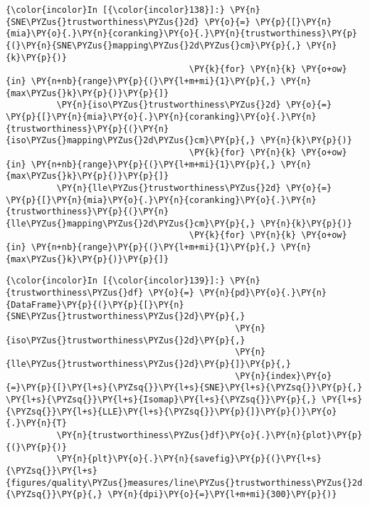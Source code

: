     \begin{Verbatim}[commandchars=\\\{\}]
{\color{incolor}In [{\color{incolor}138}]:} \PY{n}{SNE\PYZus{}trustworthiness\PYZus{}2d} \PY{o}{=} \PY{p}{[}\PY{n}{mia}\PY{o}{.}\PY{n}{coranking}\PY{o}{.}\PY{n}{trustworthiness}\PY{p}{(}\PY{n}{SNE\PYZus{}mapping\PYZus{}2d\PYZus{}cm}\PY{p}{,} \PY{n}{k}\PY{p}{)}
                                    \PY{k}{for} \PY{n}{k} \PY{o+ow}{in} \PY{n+nb}{range}\PY{p}{(}\PY{l+m+mi}{1}\PY{p}{,} \PY{n}{max\PYZus{}k}\PY{p}{)}\PY{p}{]}
          \PY{n}{iso\PYZus{}trustworthiness\PYZus{}2d} \PY{o}{=} \PY{p}{[}\PY{n}{mia}\PY{o}{.}\PY{n}{coranking}\PY{o}{.}\PY{n}{trustworthiness}\PY{p}{(}\PY{n}{iso\PYZus{}mapping\PYZus{}2d\PYZus{}cm}\PY{p}{,} \PY{n}{k}\PY{p}{)}
                                    \PY{k}{for} \PY{n}{k} \PY{o+ow}{in} \PY{n+nb}{range}\PY{p}{(}\PY{l+m+mi}{1}\PY{p}{,} \PY{n}{max\PYZus{}k}\PY{p}{)}\PY{p}{]}
          \PY{n}{lle\PYZus{}trustworthiness\PYZus{}2d} \PY{o}{=} \PY{p}{[}\PY{n}{mia}\PY{o}{.}\PY{n}{coranking}\PY{o}{.}\PY{n}{trustworthiness}\PY{p}{(}\PY{n}{lle\PYZus{}mapping\PYZus{}2d\PYZus{}cm}\PY{p}{,} \PY{n}{k}\PY{p}{)}
                                    \PY{k}{for} \PY{n}{k} \PY{o+ow}{in} \PY{n+nb}{range}\PY{p}{(}\PY{l+m+mi}{1}\PY{p}{,} \PY{n}{max\PYZus{}k}\PY{p}{)}\PY{p}{]}
\end{Verbatim}

    \begin{Verbatim}[commandchars=\\\{\}]
{\color{incolor}In [{\color{incolor}139}]:} \PY{n}{trustworthiness\PYZus{}df} \PY{o}{=} \PY{n}{pd}\PY{o}{.}\PY{n}{DataFrame}\PY{p}{(}\PY{p}{[}\PY{n}{SNE\PYZus{}trustworthiness\PYZus{}2d}\PY{p}{,}
                                             \PY{n}{iso\PYZus{}trustworthiness\PYZus{}2d}\PY{p}{,}
                                             \PY{n}{lle\PYZus{}trustworthiness\PYZus{}2d}\PY{p}{]}\PY{p}{,}
                                             \PY{n}{index}\PY{o}{=}\PY{p}{[}\PY{l+s}{\PYZsq{}}\PY{l+s}{SNE}\PY{l+s}{\PYZsq{}}\PY{p}{,} \PY{l+s}{\PYZsq{}}\PY{l+s}{Isomap}\PY{l+s}{\PYZsq{}}\PY{p}{,} \PY{l+s}{\PYZsq{}}\PY{l+s}{LLE}\PY{l+s}{\PYZsq{}}\PY{p}{]}\PY{p}{)}\PY{o}{.}\PY{n}{T}
          \PY{n}{trustworthiness\PYZus{}df}\PY{o}{.}\PY{n}{plot}\PY{p}{(}\PY{p}{)}
          \PY{n}{plt}\PY{o}{.}\PY{n}{savefig}\PY{p}{(}\PY{l+s}{\PYZsq{}}\PY{l+s}{figures/quality\PYZus{}measures/line\PYZus{}trustworthiness\PYZus{}2d.png}\PY{l+s}{\PYZsq{}}\PY{p}{,} \PY{n}{dpi}\PY{o}{=}\PY{l+m+mi}{300}\PY{p}{)}
\end{Verbatim}

